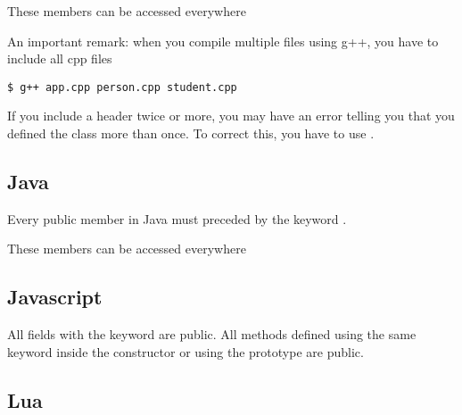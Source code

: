 \documentclass{KodeBook}
\begin{document}
These members can be accessed everywhere



An important remark: when you compile multiple files using g++, you have to include all cpp files
\begin{lstlisting}[style=shellStyle]
$ g++ app.cpp person.cpp student.cpp
\end{lstlisting}

If you include a header twice or more, you may have an error telling you that you defined the class more than once. 
To correct this, you have to use .



\subsection{Java}

Every public member in Java must preceded by the keyword . 



These members can be accessed everywhere


\subsection{Javascript} 

All fields with the keyword  are public. 
All  methods defined using the same keyword inside the constructor or using the prototype are public.

%
%
%


\subsection{Lua}

\end{document}

